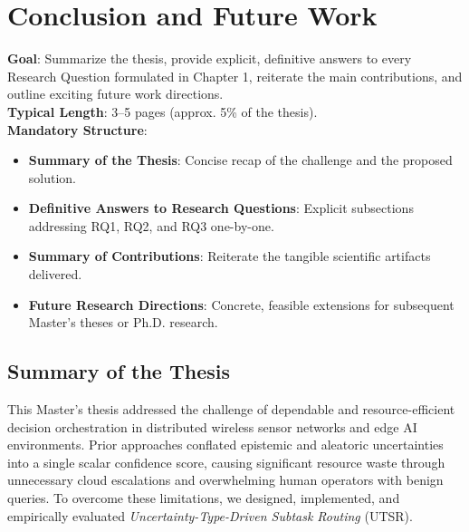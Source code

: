 
\chapter{Conclusion and Future Work}
\label{ch:conclusion}

\begin{takeawaybox}
\textbf{Goal}: Summarize the thesis, provide explicit, definitive answers to every Research Question formulated in Chapter 1, reiterate the main contributions, and outline exciting future work directions.\\
\textbf{Typical Length}: 3--5 pages (approx. 5\% of the thesis).\\
\textbf{Mandatory Structure}:
\begin{itemize}[leftmargin=*]
    \item \textbf{Summary of the Thesis}: Concise recap of the challenge and the proposed solution.
    \item \textbf{Definitive Answers to Research Questions}: Explicit subsections addressing RQ1, RQ2, and RQ3 one-by-one.
    \item \textbf{Summary of Contributions}: Reiterate the tangible scientific artifacts delivered.
    \item \textbf{Future Research Directions}: Concrete, feasible extensions for subsequent Master's theses or Ph.D. research.
\end{itemize}
\end{takeawaybox}

\section{Summary of the Thesis}
\label{sec:concl_summary}

This Master's thesis addressed the challenge of dependable and resource-efficient decision orchestration in distributed wireless sensor networks and edge AI environments. Prior approaches conflated epistemic and aleatoric uncertainties into a single scalar confidence score, causing significant resource waste through unnecessary cloud escalations and overwhelming human operators with benign queries. To overcome these limitations, we designed, implemented, and empirically evaluated \emph{Uncertainty-Type-Driven Subtask Routing} (\ac{UTSR}).

